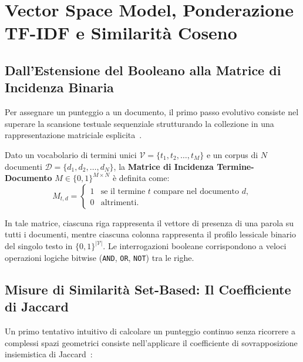 \chapter{Vector Space Model, Ponderazione TF-IDF e Similarit\`a Coseno}
\label{chap:vsm-smart}
\label{chap:retrieval-vsm-bm25}
\label{chap:vsm-tfidf-cosine}

\FloatBarrier
\section{Dall'Estensione del Booleano alla Matrice di Incidenza Binaria}
\label{sec:matrice-incidenza-binaria}

Per assegnare un punteggio a un documento, il primo passo evolutivo consiste nel superare la scansione testuale sequenziale strutturando la collezione in una rappresentazione matriciale esplicita~\cite{manning2008}.

\begin{definition}
Dato un vocabolario di termini unici $\mathcal{V} = \{t_1, t_2, \dots, t_M\}$ e un corpus di $N$ documenti $\mathcal{D} = \{d_1, d_2, \dots, d_N\}$, la \textbf{Matrice di Incidenza Termine-Documento} $M \in \{0, 1\}^{M \times N}$ \`e definita come:
\begin{equation}
M_{t, d} = \begin{cases} 1 & \text{se il termine } t \text{ compare nel documento } d, \\ 0 & \text{altrimenti.} \end{cases}
\end{equation}
\end{definition}
In tale matrice, ciascuna riga rappresenta il vettore di presenza di una parola su tutti i documenti, mentre ciascuna colonna rappresenta il profilo lessicale binario del singolo testo in $\{0, 1\}^{|\mathcal{V}|}$. Le interrogazioni booleane corrispondono a veloci operazioni logiche bitwise (\texttt{AND}, \texttt{OR}, \texttt{NOT}) tra le righe.

\FloatBarrier
\section{Misure di Similarit\`a Set-Based: Il Coefficiente di Jaccard}
\label{sec:jaccard-coefficient}
\label{sec:jaccard-scoring}

Un primo tentativo intuitivo di calcolare un punteggio continuo senza ricorrere a complessi spazi geometrici consiste nell'applicare il coefficiente di sovrapposizione insiemistica di Jaccard~\cite{manning2008}:

